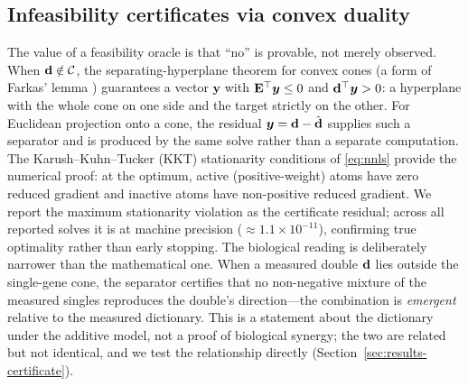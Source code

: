 \subsection{Infeasibility certificates via convex duality}
\label{sec:methods-cert}
The value of a feasibility oracle is that ``no'' is provable, not merely observed. When
$\mathbf{d}\notin\mathcal{C}$, the separating-hyperplane theorem for convex cones (a form of Farkas'
lemma \citep{Farkas1902}) guarantees a vector $\bm{y}$ with $\mathbf{E}^{\top}\bm{y}\le 0$ and
$\mathbf{d}^{\top}\bm{y}>0$: a hyperplane with the whole cone on one side and the target strictly
on the other. For Euclidean projection onto a cone, the residual
$\bm{y}=\mathbf{d}-\hat{\mathbf{d}}$ supplies such a separator and is produced by the same solve rather
than a separate computation. The
Karush--Kuhn--Tucker (KKT) stationarity conditions of \eqref{eq:nnls} provide the numerical
proof: at the optimum, active (positive-weight) atoms have zero reduced gradient and inactive
atoms have non-positive reduced gradient. We report the maximum stationarity violation as the
certificate residual; across all reported solves it is at machine precision
($\approx\!1.1\times10^{-11}$), confirming true optimality rather than early stopping. The
biological reading is deliberately narrower than the mathematical one. When a measured double
$\mathbf{d}$ lies outside the single-gene cone, the separator certifies that no non-negative mixture
of the measured singles reproduces the double's direction---the combination is \emph{emergent}
relative to the measured dictionary. This is a statement about the dictionary under the additive
model, not a proof of biological synergy; the two are related but not identical, and we test the
relationship directly (Section~\ref{sec:results-certificate}).


